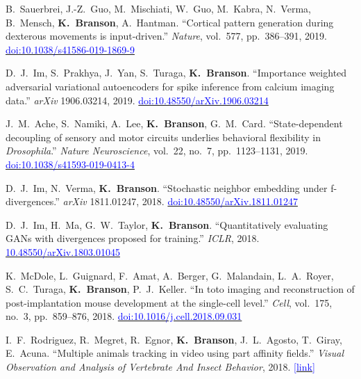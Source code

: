 \begin{cvenum}
\item B.~Sauerbrei, J.-Z.~Guo, M.~Mischiati, W.~Guo, M.~Kabra, N.~Verma, B.~Mensch, {\bf K.~Branson}, A.~Hantman. ``Cortical pattern generation during dexterous movements is input-driven.'' {\em Nature}, vol.~577, pp.~386--391, 2019.\\\href{https://doi.org/10.1038/s41586-019-1869-9}{\small\textcolor{blue}{doi:10.1038/s41586-019-1869-9}}

\item D.~J.~Im, S.~Prakhya, J.~Yan, S.~Turaga, {\bf K.~Branson}. ``Importance weighted adversarial variational autoencoders for spike inference from calcium imaging data.'' {\em arXiv} 1906.03214, 2019. \href{https://doi.org/10.48550/arXiv.1906.03214}{\small\textcolor{blue}{doi:10.48550/arXiv.1906.03214}}

\item J.~M.~Ache, S.~Namiki, A.~Lee, {\bf K.~Branson}, G.~M.~Card. ``State-dependent decoupling of sensory and motor circuits underlies behavioral flexibility in {\em {D}rosophila}.'' {\em Nature Neuroscience}, vol.~22, no.~7, pp.~1123--1131, 2019. \href{https://doi.org/10.1038/s41593-019-0413-4}{\small\textcolor{blue}{doi:10.1038/s41593-019-0413-4}}

\item D.~J.~Im, N.~Verma, {\bf K.~Branson}. ``Stochastic neighbor embedding under f-divergences.'' {\em arXiv} 1811.01247, 2018. \href{https://doi.org/10.48550/arXiv.1811.01247}{\small\textcolor{blue}{doi:10.48550/arXiv.1811.01247}}

\item D.~J.~Im, H.~Ma, G.~W.~Taylor, {\bf K.~Branson}. ``Quantitatively evaluating {GAN}s with divergences proposed for training.'' {\em ICLR}, 2018. \href{https://openreview.net/forum?id=SJQHjzZ0-}{\small\textcolor{blue}{10.48550/arXiv.1803.01045}}

\item K.~McDole, L.~Guignard, F.~Amat, A.~Berger, G.~Malandain, L.~A.~Royer, S.~C.~Turaga, {\bf K.~Branson}, P.~J.~Keller. ``In toto imaging and reconstruction of post-implantation mouse development at the single-cell level.'' {\em Cell}, vol.~175, no.~3, pp.~859--876, 2018. \href{https://doi.org/10.1016/j.cell.2018.09.031}{\small\textcolor{blue}{doi:10.1016/j.cell.2018.09.031}}

\item I.~F.~Rodriguez, R.~Megret, R.~Egnor, {\bf K.~Branson}, J.~L.~Agosto, T.~Giray, E.~Acuna. ``Multiple animals tracking in video using part affinity fields.'' {\em Visual Observation and Analysis of Vertebrate And Insect Behavior}, 2018. \href{https://homepages.inf.ed.ac.uk/rbf/VAIB18PAPERS/vaib18rodriguez.pdf}{\small\textcolor{blue}{[link]}}


\end{cvenum}
